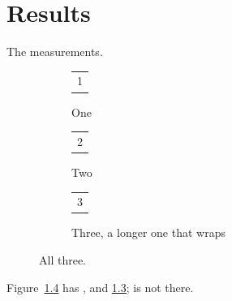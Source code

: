 \documentclass{report}
\begin{document}
\chapter{Results}
The measurements.
\begin{figure}[h]
\centering
\begin{subfigure}{0.3\textwidth}
\centering
\begin{tabular}{c}1\end{tabular}
\caption{One}\label{a}
\end{subfigure}%
\begin{subfigure}{0.3\textwidth}
\centering
\begin{tabular}{c}2\end{tabular}
\caption{Two}\label{b}
\end{subfigure}%
\begin{subfigure}{0.3\textwidth}
\centering
\begin{tabular}{c}3\end{tabular}
\caption{Three, a longer one that wraps}\label{c}
\end{subfigure}
\caption{All three.}\label{all}
\end{figure}
Figure~\ref{all} has ,  and \ref{c};  is not there.
\end{document}
